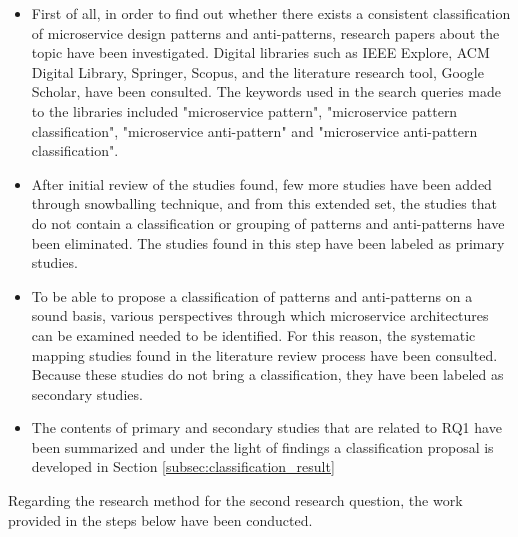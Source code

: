 \documentclass{Configuration_Files/PoliMi3i_thesis}
\begin{document}
\begin{itemize}
    \item First of all, in order to find out whether there exists a consistent classification of microservice design patterns and anti-patterns, research papers about the topic have been investigated.
    Digital libraries such as IEEE Explore, ACM Digital Library, Springer, Scopus, and the literature research tool, Google Scholar, have been consulted.
    The keywords used in the search queries made to the libraries included "microservice pattern", "microservice pattern classification", "microservice anti-pattern" and "microservice anti-pattern classification".

    \item After initial review of the studies found, few more studies have been added through snowballing technique, and from this extended set, the studies that do not contain a classification or grouping of patterns and anti-patterns have been eliminated.
    The studies found in this step have been labeled as primary studies.
    
    \item To be able to propose a classification of patterns and anti-patterns on a sound basis, various perspectives through which microservice architectures can be examined needed to be identified.
    For this reason, the systematic mapping studies found in the literature review process have been consulted.
    Because these studies do not bring a classification, they have been labeled as secondary studies.
    
    \item The contents of primary and secondary studies that are related to RQ1 have been summarized and under the light of findings a classification proposal is developed in Section \ref{subsec:classification_result}
\end{itemize}

Regarding the research method for the second research question, the work provided in the steps below have been conducted.
\end{document}
